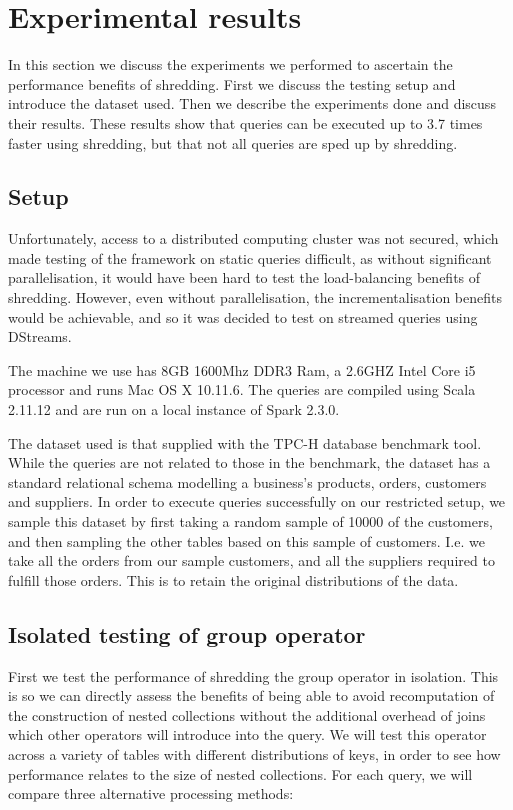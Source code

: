 \chapter{Experimental results} \label{results}

In this section we discuss the experiments we performed to ascertain the performance benefits of shredding. First we discuss the testing setup and introduce the dataset used. Then we describe the experiments done and discuss their results. These results show that queries can be executed up to 3.7 times faster using shredding, but that not all queries are sped up by shredding.

\section{Setup}

Unfortunately, access to a distributed computing cluster was not secured, which made testing of the framework on static queries difficult, as without significant parallelisation, it would have been hard to test the load-balancing benefits of shredding. However, even without parallelisation, the incrementalisation benefits would be achievable, and so it was decided to test on streamed queries using DStreams.

The machine we use has 8GB 1600Mhz DDR3 Ram, a 2.6GHZ Intel Core i5 processor and runs Mac OS X 10.11.6. The queries are compiled using Scala 2.11.12 and are run on a local instance of Spark 2.3.0. 

The dataset used is that supplied with the TPC-H \cite{tpch} database benchmark tool. While the queries are not related to those in the benchmark, the dataset has a standard relational schema modelling a business's products, orders, customers and suppliers. In order to execute queries successfully on our restricted setup, we sample this dataset by first taking a random sample of 10000 of the customers, and then sampling the other tables based on this sample of customers. I.e. we take all the orders from our sample customers, and all the suppliers required to fulfill those orders. This is to retain the original distributions of the data.

\section{Isolated testing of group operator}
First we test the performance of shredding the group operator in isolation. This is so we can directly assess the benefits of being able to avoid recomputation of the construction of nested collections without the additional overhead of joins which other operators will introduce into the query. We will test this operator across a variety of tables with different distributions of keys, in order to see how performance relates to the size of nested collections. For each query, we will compare three alternative processing methods:

